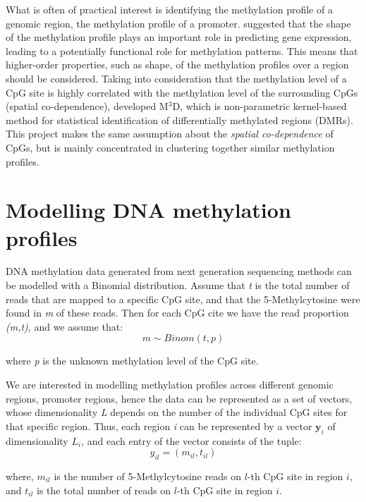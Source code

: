 What is often of practical interest is identifying the methylation profile of a genomic region, \eg the methylation profile of a promoter. \cite{Vanderkraats2013} suggested that the shape of the methylation profile plays an important role in predicting gene expression, leading to a potentially functional role for methylation patterns. This means that higher-order properties, such as shape, of the methylation profiles over a region should be considered. Taking into consideration that the methylation level of a CpG site is highly correlated with the methylation level of the surrounding CpGs (\ie spatial co-dependence), \cite{Mayo2014} developed M$^3$D, which is non-parametric kernel-based method for statistical identification of differentially methylated regions (DMRs). This project makes the same assumption about the \emph{spatial co-dependence} of CpGs, but is mainly concentrated in clustering together similar methylation profiles.



\section{Modelling DNA methylation profiles}
DNA methylation data generated from next generation sequencing methods can be modelled with a Binomial distribution. Assume that \emph{t} is the total number of reads that are mapped to a specific CpG site, and that the 5-Methylcytosine were found in \emph{m} of these reads. Then for each CpG cite we have the read proportion \emph{(m,t)}, and we assume that:
\begin{equation} \label{binom-1d-f}
	m \sim Binom(t, p)
\end{equation}

where \emph{p} is the unknown methylation level of the CpG site.

We are interested in modelling methylation profiles across different genomic regions, \eg promoter regions, hence the data can be represented as a set of vectors, whose dimensionality \emph{L} depends on the number of the individual CpG sites for that specific region. Thus, each region \emph{i} can be represented by a vector $\mathbf{y}_{i}$ of dimensionality $L_{i}$, and each entry of the vector consists of the tuple:
\begin{equation}
	y_{il} = (m_{il},t_{il})
\end{equation}

where, $m_{il}$ is the number of 5-Methylcytosine reads on $l$-th CpG site in region $i$, and $t_{il}$ is the total number of reads on $l$-th CpG site in region $i$. 

